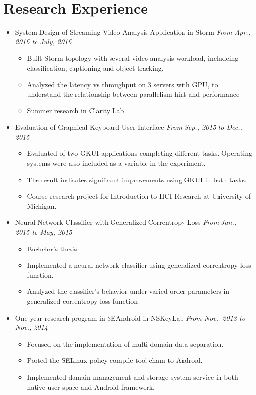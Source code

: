 \documentclass[a4paper,11pt]{article}
\begin{document}
\section{Research Experience}
\begin{itemize}
    \item System Design of Streaming Video Analysis Application in Storm \hfill \textit{From Apr., 2016 to July, 2016}
    \begin{itemize}
        \item Built Storm topology with several video analysis workload, includeing classification, 
captioning and object tracking.
        \item Analyzed the latency vs throughput on 3 servers with GPU, to understand the relationship 
between parallelism hint and performance
        \item Summer research in Clarity Lab
    \end{itemize}

    \item Evaluation of Graphical Keyboard User Interface \hfill \textit{From Sep., 2015 to Dec., 2015}
    \begin{itemize}
        \item Evaluated of two GKUI applications completing different tasks. Operating systems were also
included as a variable in the experiment.
        \item The result indicates significant improvements using GKUI in both tasks.
        \item Course research project for Introduction to HCI Research at University of Michigan.
    \end{itemize}

    \item Neural Network Classifier with Generalized Correntropy Loss \hfill \textit{From Jan., 2015 to
May, 2015}
    \begin{itemize}
        \item Bachelor's thesis.
        \item Implemented a neural network classifier using generalized correntropy loss function.
        \item Analyzed the classifier's behavior under varied order parameters in generalized correntropy loss
function
    \end{itemize}

    \item One year research program in SEAndroid in NSKeyLab \hfill \textit{From Nov., 2013 to Nov., 2014}
    \begin{itemize}
        \item Focused on the implementation of multi-domain data separation.
        \item Ported the SELinux policy compile tool chain to Android.
        \item Implemented domain management and storage system service in both native user space and Android
framework.
    \end{itemize}


\end{itemize}
\end{document}
